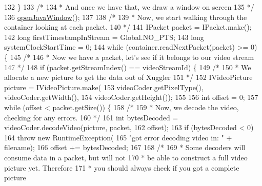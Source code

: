 \begin{DoxyCode}
132         \}
133         \textcolor{comment}{/*}
134 \textcolor{comment}{         * And once we have that, we draw a window on screen
}
135 \textcolor{comment}{         */}
136         \hyperlink{classworkspace_1_1_a_r_drone_stream_image_1_1src_1_1_decode_and_play_video_aa49a37446f884c860002ed73ae145601}{openJavaWindow}();
137 
138         \textcolor{comment}{/*}
139 \textcolor{comment}{         * Now, we start walking through the container looking at each packet.
}
140 \textcolor{comment}{         */}
141         IPacket packet = IPacket.make();
142         \textcolor{keywordtype}{long} firstTimestampInStream = Global.NO\_PTS;
143         \textcolor{keywordtype}{long} systemClockStartTime = 0;
144         \textcolor{keywordflow}{while} (container.readNextPacket(packet) >= 0) \{
145             \textcolor{comment}{/*}
146 \textcolor{comment}{             * Now we have a packet, let's see if it belongs to our video stream
}
147 \textcolor{comment}{             */}
148             \textcolor{keywordflow}{if} (packet.getStreamIndex() == videoStreamId) \{
149                 \textcolor{comment}{/*}
150 \textcolor{comment}{                 * We allocate a new picture to get the data out of Xuggler
}
151 \textcolor{comment}{                 */}
152                 IVideoPicture picture = IVideoPicture.make(
153                         videoCoder.getPixelType(), videoCoder.getWidth(),
154                         videoCoder.getHeight());
155 
156                 \textcolor{keywordtype}{int} offset = 0;
157                 \textcolor{keywordflow}{while} (offset < packet.getSize()) \{
158                     \textcolor{comment}{/*}
159 \textcolor{comment}{                     * Now, we decode the video, checking for any errors.
}
160 \textcolor{comment}{                     */}
161                     \textcolor{keywordtype}{int} bytesDecoded = videoCoder.decodeVideo(picture, packet,
162                             offset);
163                     \textcolor{keywordflow}{if} (bytesDecoded < 0)
164                         \textcolor{keywordflow}{throw} \textcolor{keyword}{new} RuntimeException(
165                                 \textcolor{stringliteral}{"got error decoding video in: "} + filename);
166                     offset += bytesDecoded;
167 
168                     \textcolor{comment}{/*}
169 \textcolor{comment}{                     * Some decoders will consume data in a packet, but will not
}
170 \textcolor{comment}{                     * be able to construct a full video picture yet. Therefore
}
171 \textcolor{comment}{                     * you should always check if you got a complete picture
}
\end{DoxyCode}
